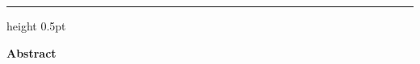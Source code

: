 \documentclass[11pt]{article}
\theoremstyle{plain}
\theoremstyle{definition}
\theoremstyle{remark}
\begin{document}
\begin{tcolorbox}
    \vspace{10pt}
    
    {\color{ldmedge}\hrule height 0.5pt}
    
    \vspace{10pt}
    
    {\color{ldmdarkred}\sffamily\bfseries\large
    Abstract
    }\par
    
    \vspace{4pt}
    
    {\color{ldmtext}\small
    \par
    }
\end{tcolorbox}














\newpage
\appendix





\end{document}
